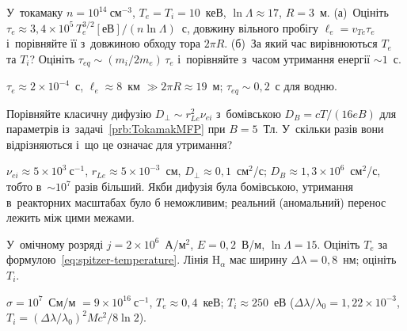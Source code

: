 \begin{problem}\label{prb:TokamakMFP}
	У~токамаку $n=10^{14}~\text{см}^{-3}$, $T_e=T_i=10$~кеВ, $\ln\Lambda\approx17$, $R=3$~м.
	(а)~Оцініть $\tau_e\approx3{,}4\times10^{5}\,T_e^{3/2}[\text{еВ}]/(n\ln\Lambda)$~с, довжину вільного
	пробігу $\ell_e=v_{Te}\tau_e$ і~порівняйте її з~довжиною обходу тора $2\pi R$.
	(б)~За який час вирівнюються $T_e$ та $T_i$? Оцініть $\tau_{eq}\sim(m_i/2m_e)\,\tau_e$ і~порівняйте
	з~часом утримання енергії $\sim1$~с.
	\begin{solution}
		$\tau_e\approx2\times10^{-4}$~с, $\ell_e\approx8$~км $\gg2\pi R\approx19$~м;
	$\tau_{eq}\sim0{,}2$~с для водню.
	\end{solution}
\end{problem}

\begin{problem}\label{prb:ClassicalVsBohm}
	Порівняйте класичну дифузію $D_\perp\sim r_{Le}^2\nu_{ei}$ з~бомівською $D_B=cT/(16eB)$ для
	параметрів із~задачі~\ref{prb:TokamakMFP} при $B=5$~Тл. У~скільки разів вони відрізняються
	і~що це означає для утримання?
	\begin{solution}
		$\nu_{ei}\approx5\times10^{3}~\mathrm{с}^{-1}$, $r_{Le}\approx5\times10^{-3}$~см, $D_\perp\approx0{,}1$~см$^2$/с;
	$D_B\approx1{,}3\times10^{6}$~см$^2$/с, тобто в~$\sim10^{7}$ разів більший. Якби дифузія була бомівською,
	утримання в~реакторних масштабах було б неможливим; реальний (аномальний) перенос лежить між цими межами.
	\end{solution}
\end{problem}

\begin{problem}\label{prb:SpitzerTe}
	У~омічному розряді $j=2\times10^{6}$~А/м$^2$, $E=0{,}2$~В/м, $\ln\Lambda=15$. Оцініть $T_e$ за
	формулою~\eqref{eq:spitzer-temperature}. Лінія $\mathrm{H}_\alpha$ має ширину $\Delta\lambda=0{,}8$~нм; оцініть $T_i$.
	\begin{solution}
		$\sigma=10^{7}$~См/м $=9\times10^{16}~\mathrm{с}^{-1}$, $T_e\approx0{,}4$~кеВ; $T_i\approx250$~еВ
	($\Delta\lambda/\lambda_0=1{,}22\times10^{-3}$, $T_i=(\Delta\lambda/\lambda_0)^2Mc^2/8\ln2$).
	\end{solution}
\end{problem}


